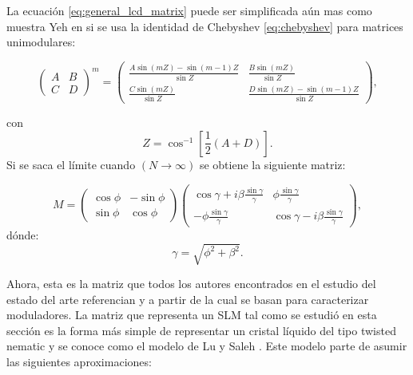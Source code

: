 La ecuación \ref{eq:general_lcd_matrix} puede ser simplificada aún
mas como muestra Yeh en  si se usa la identidad de Chebyshev
\ref{eq:chebyshev} para matrices unimodulares:  

\begin{equation}
  \begin{pmatrix}
    A & B \\ C & D
  \end{pmatrix}^m
=
\begin{pmatrix}
  \frac{A\sin{ (mZ) }-\sin(m-1)Z }{\sin{Z} }
  &\frac{B\sin{(mZ)}}{\sin{Z}}\\
\frac{C\sin{(mZ)}}{\sin{Z}}&   \frac{D\sin{ (mZ) }-\sin(m-1)Z }{\sin{Z} }
\end{pmatrix},
  \label{eq:chebyshev}
\end{equation}

con \[Z = \cos^{-1}{\left[\frac{1}{2}(A+D)\right]}.\]
Si se saca el límite cuando $(N\rightarrow \infty)$ se obtiene la
siguiente matriz:


\begin{equation}
  \label{eq:TN-LCD_Jones_Matrix}
  M=
  \begin{pmatrix}
    \cos{\phi} & -\sin{\phi}\\\sin{\phi}&\cos{\phi}
  \end{pmatrix}
  \begin{pmatrix}
    \cos{\gamma}+i\beta\frac{\sin{\gamma}}{\gamma} & \phi\frac{\sin{\gamma}}{\gamma}\\
-\phi\frac{\sin{\gamma}}{\gamma}   & \cos{\gamma}-i\beta\frac{\sin{\gamma}}{\gamma}
  \end{pmatrix},
\end{equation} 
dónde:
\[\gamma=\sqrt{\phi^2+\beta^2}.\]

Ahora, esta es la matriz que todos los autores encontrados en el
estudio del estado del arte referencian y a partir de la cual se basan
para caracterizar moduladores. La matriz que representa un
SLM  tal como se estudió en esta sección es la forma más
simple de representar un cristal líquido del tipo twisted nematic y se
conoce como el modelo de Lu y Saleh . Este modelo
parte de asumir las siguientes aproximaciones:

